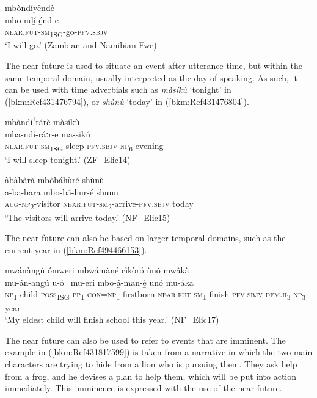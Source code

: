 \ea
\label{bkm:Ref99971699}
\glll mbòndíyêndè\\
mbo-ndí̲-é̲nd-e\\
\textsc{near}.\textsc{fut}-\textsc{sm}\textsubscript{1SG}-go-\textsc{pfv}.\textsc{sbjv}\\
\glt ‘I will go.’ (Zambian and Namibian Fwe)
\z

The near future is used to situate an event after utterance time, but within the same temporal domain, usually interpreted as the day of speaking. As such, it can be used with time adverbials such as \textit{màsíkù} ‘tonight’ in (\ref{bkm:Ref431476794}), or \textit{shùnù} ‘today’ in (\ref{bkm:Ref431476804}).

\ea
\label{bkm:Ref431476794}
mbàndíꜝrárè màsíkù\\
\gll mba-ndí̲-rá̲ːr-e      ma-sikú\\
\textsc{near}.\textsc{fut}-\textsc{sm}\textsubscript{1SG}-sleep-\textsc{pfv}.\textsc{sbjv}  \textsc{np}\textsubscript{6}-evening\\
\glt ‘I will sleep tonight.’ (ZF\_Elic14)
\z

\ea
\label{bkm:Ref431476804}
àbàbàrà mbòbáhùré shùnù\\
\gll a-ba-bara    mbo-bá̲-hur-é̲      shunu\\
\textsc{aug}-\textsc{np}\textsubscript{2}-visitor  \textsc{near}.\textsc{fut}-\textsc{sm}\textsubscript{2}-arrive-\textsc{pfv}.\textsc{sbjv}  today\\
\glt ‘The visitors will arrive today.’ (NF\_Elic15)
\z

The near future can also be based on larger temporal domains, such as the current year in (\ref{bkm:Ref494466153}).

\ea
\label{bkm:Ref494466153}
mwánàngú ómweri mbwámàné cìkòró ùnó mwâkà\\
\gll mu-án-angú    u-ó=mu-eri  mbo-á̲-man-é̲      unó    mu-áka \\
\textsc{np}\textsubscript{1}-child-\textsc{poss}\textsubscript{1SG}  \textsc{pp}\textsubscript{1}-\textsc{con}=\textsc{np}\textsubscript{1}-firstborn
\textsc{near}.\textsc{fut}-\textsc{sm}\textsubscript{1}-finish-\textsc{pfv}.\textsc{sbjv}  \textsc{dem}.\textsc{ii}\textsubscript{3}  \textsc{np}\textsubscript{3}-year\\
\glt ‘My eldest child will finish school this year.’ (NF\_Elic17)
\z

The near future can also be used to refer to events that are imminent. The example in (\ref{bkm:Ref431817599}) is taken from a narrative in which the two main characters are trying to hide from a lion who is pursuing them. They ask help from a frog, and he devises a plan to help them, which will be put into action immediately. This imminence is expressed with the use of the near future.

